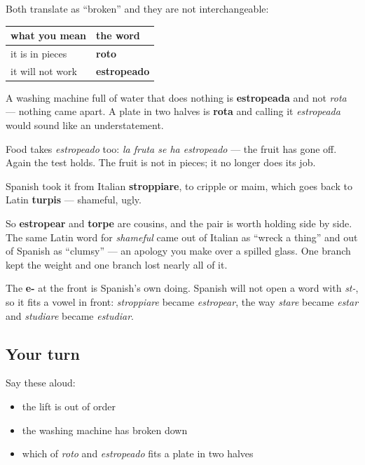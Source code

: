 \begin{grammarlens}[title={Grammar Lens: estropeado is not roto}]
Both translate as \textquotedblleft{}broken\textquotedblright{} and they are not interchangeable:

\noindent
\begin{tabularx}{\linewidth}{@{}>{\raggedright\arraybackslash}X>{\raggedright\arraybackslash}X@{}}
\toprule
\textbf{what you mean} & \textbf{the word} \\
\midrule
it is in pieces & \textbf{roto} \\
it will not work & \textbf{estropeado} \\
\bottomrule
\end{tabularx}

A washing machine full of water that does nothing is \textbf{estropeada} and not \emph{rota} — nothing came apart. A plate in two halves is \textbf{rota} and calling it \emph{estropeada} would sound like an understatement.

Food takes \emph{estropeado} too: \emph{la fruta se ha estropeado} — the fruit has gone off. Again the test holds. The fruit is not in pieces; it no longer does its job.
\end{grammarlens}

\begin{cousinweb}
Spanish took it from Italian \textbf{stroppiare}, to cripple or maim, which goes back to Latin \textbf{turpis} — shameful, ugly.

So \textbf{estropear} and \textbf{torpe} are cousins, and the pair is worth holding side by side. The same Latin word for \emph{shameful} came out of Italian as \textquotedblleft{}wreck a thing\textquotedblright{} and out of Spanish as \textquotedblleft{}clumsy\textquotedblright{} — an apology you make over a spilled glass. One branch kept the weight and one branch lost nearly all of it.

The \textbf{e-} at the front is Spanish's own doing. Spanish will not open a word with \emph{st-}, so it fits a vowel in front: \emph{stroppiare} became \emph{estropear}, the way \emph{stare} became \emph{estar} and \emph{studiare} became \emph{estudiar}.
\end{cousinweb}

\subsection*{Your turn}
Say these aloud:

\begin{itemize}
\raggedright
  \item the lift is out of order
  \item the washing machine has broken down
  \item which of \emph{roto} and \emph{estropeado} fits a plate in two halves
\end{itemize}

